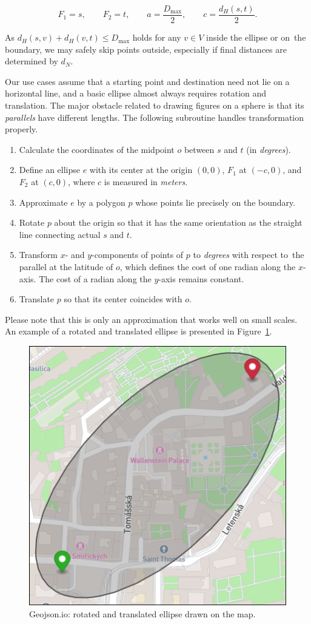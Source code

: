 \begin{equation*}
F_{1} = s, \qquad
  F_{2} = t, \qquad
    a = \frac{D_{\text{max}}}{2}, \qquad
      c = \frac{d_{H}(s, t)}{2}.
\end{equation*}

As $d_{H}(s, v) + d_{H}(v, t) \leq D_{\text{max}}$ holds for any $v \in V$ inside the ellipse or on~the bound\-ary, we may safely skip points outside, especially if final distances are de\-ter\-mined by $d_{N}$.

Our use cases assume that a starting point and destination need not lie on a horizontal line, and a basic ellipse almost always requires rotation and translation. The major obstacle related to drawing figures on a sphere is that its \emph{parallels} have different lengths. The following subroutine handles transformation properly.

\begin{enumerate}
\item Calculate the coordinates of the midpoint $o$ between $s$ and $t$ (in \emph{degrees}).
\item Define an ellipse $e$ with its center at the origin $(0, 0)$, $F_{1}$ at $(-c, 0)$, and $F_{2}$ at $(c, 0)$, where $c$ is measured in \emph{meters}.
\item Approximate $e$ by a polygon $p$ whose points lie precisely on the boundary.
\item Rotate $p$ about the origin so that it has the same orientation as the straight line connecting actual $s$ and $t$.
\item Transform $x$- and $y$-components of points of $p$ to \emph{degrees} with respect to~the parallel at the latitude of $o$, which defines the cost of one radian along the $x$-axis. The cost of a radian along the $y$-axis remains constant.
\item Translate $p$ so that its center coincides with $o$.
\end{enumerate}

\newpage

Please note that this is only an approximation that works well on small scales. An example of a rotated and translated ellipse is presented in Figure~\ref{fig:rotated-ellipse}.

\begin{figure}[!h]
\centering
\includegraphics[width=0.5\linewidth]{img/design/rotated-ellipse.png}
\caption{Geojson.io: rotated and translated ellipse drawn on the map.}
\label{fig:rotated-ellipse}
\end{figure}

